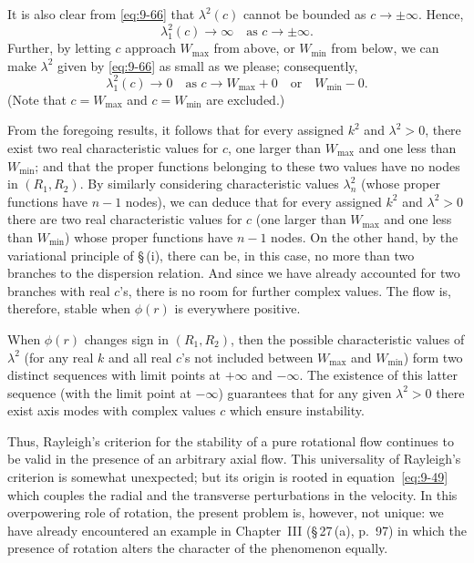It is also clear from \eqref{eq:9-66} that $\lambda^2(c)$ cannot be bounded as $c \to \pm\infty$. Hence,
\begin{equation}
\lambda_1^2(c) \to \infty \quad \text{as } c \to \pm\infty. \label{eq:9-73}
\end{equation}
Further, by letting $c$ approach $W_\mathrm{max}$ from above, or $W_\mathrm{min}$ from below, we can make $\lambda^2$ given by \eqref{eq:9-66} as small as we please; consequently,
\begin{equation}
\lambda_1^2(c) \to 0 \quad \text{as } c \to W_\mathrm{max} + 0 \quad \text{or} \quad W_\mathrm{min} - 0. \label{eq:9-74}
\end{equation}
(Note that $c = W_\mathrm{max}$ and $c = W_\mathrm{min}$ are excluded.)

From the foregoing results, it follows that for every assigned $k^2$ and $\lambda^2 > 0$, there exist two real characteristic values for $c$, one larger than $W_\mathrm{max}$ and one less than $W_\mathrm{min}$; and that the proper functions belonging to these two values have no nodes in $(R_1, R_2)$. By similarly considering characteristic values $\lambda_n^2$ (whose proper functions have $n-1$ nodes), we can deduce that for every assigned $k^2$ and $\lambda^2 > 0$ there are two real characteristic values for $c$ (one larger than $W_\mathrm{max}$ and one less than $W_\mathrm{min}$) whose proper functions have $n-1$ nodes. On the other hand, by the variational principle of \S\,(i), there can be, in this case, no more than two branches to the dispersion relation. And since we have already accounted for two branches with real $c$'s, there is no room for further complex values. The flow is, therefore, stable when $\phi(r)$ is everywhere positive.

When $\phi(r)$ changes sign in $(R_1, R_2)$, then the possible characteristic values of $\lambda^2$ (for any real $k$ and all real $c$'s not included between $W_\mathrm{max}$ and $W_\mathrm{min}$) form two distinct sequences with limit points at $+\infty$ and $-\infty$. The existence of this latter sequence (with the limit point at $-\infty$) guarantees that for any given $\lambda^2 > 0$ there exist axis modes with complex values $c$ which ensure instability.

Thus, Rayleigh's criterion for the stability of a pure rotational flow continues to be valid in the presence of an arbitrary axial flow. This universality of Rayleigh's criterion is somewhat unexpected; but its origin is rooted in equation~\eqref{eq:9-49} which couples the radial and the transverse perturbations in the velocity. In this overpowering role of rotation, the present problem is, however, not unique: we have already encountered an example in Chapter~III (\S\,27\,(a), p.~97) in which the presence of rotation alters the character of the phenomenon equally.

